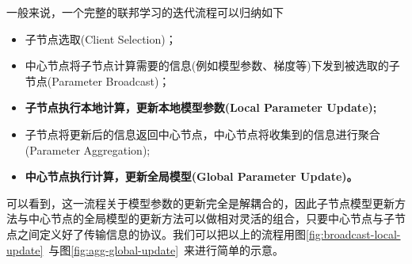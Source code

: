 

一般来说，一个完整的联邦学习的迭代流程可以归纳如下
\begin{itemize}
    \item 子节点选取(Client Selection)；
    \item 中心节点将子节点计算需要的信息(例如模型参数、梯度等)下发到被选取的子节点(Parameter Broadcast)；
    \item {\bfseries 子节点执行本地计算，更新本地模型参数(Local Parameter Update);}
    \item 子节点将更新后的信息返回中心节点，中心节点将收集到的信息进行聚合(Parameter Aggregation);
    \item {\bfseries 中心节点执行计算，更新全局模型(Global Parameter Update)。}
\end{itemize}
可以看到，这一流程关于模型参数的更新完全是解耦合的，因此子节点模型更新方法与中心节点的全局模型的更新方法可以做相对灵活的组合，只要中心节点与子节点之间定义好了传输信息的协议。我们可以把以上的流程用图\ref{fig:broadcast-local-update}~与图\ref{fig:agg-global-update}~来进行简单的示意。


